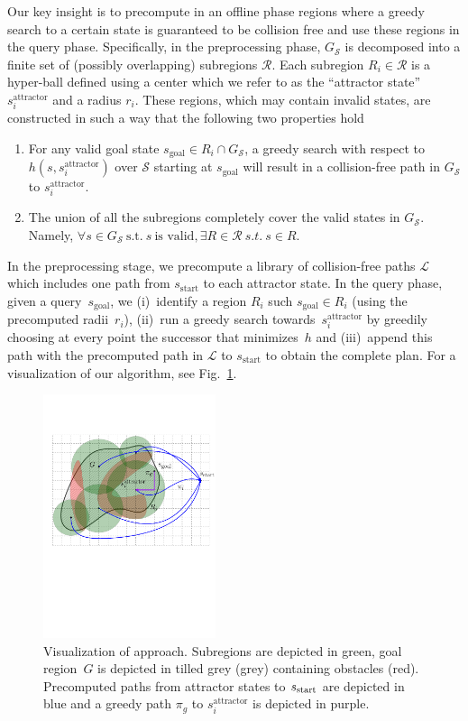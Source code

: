 \documentclass[letterpaper]{article} %
\newcommand{\calL}{\ensuremath{\mathcal{L}}\xspace}
\newcommand{\calS}{\ensuremath{\mathcal{S}}\xspace}
\newcommand{\calR}{\ensuremath{\mathcal{R}}\xspace}
\newcommand{\sAttract}{\ensuremath{s^{\text{attractor}}_i}\xspace}
\newcommand{\sStart}{\ensuremath{s_{\text{start}}\xspace}}
\newcommand{\sGoal}{\ensuremath{s_{\text{goal}}\xspace}}
\begin{document}
Our key insight is to precompute in an offline phase regions where a greedy search to a certain state is guaranteed to be collision free and use these regions in the query phase.
Specifically, in the preprocessing phase, $G_\calS$ is decomposed into a finite  set of (possibly overlapping) subregions $\calR$.
Each subregion $R_i \in \calR$ is a hyper-ball defined using a center which we refer to as the ``attractor state''~
\sAttract and a radius $r_i$.
These regions, which may contain invalid states, are constructed in such a way that the following two properties hold
\begin{enumerate}[label={\textbf{P\arabic*}}]
  \item \label{property:1} For any valid goal state $s_{\text{goal}} \in R_i \cap G_\calS$, a greedy search with respect to $h(s, \sAttract)$ over $\calS$ starting at $\sGoal$ will result in a collision-free path in $G_\calS$ to \sAttract.
  \item \label{property:2} The union of all the subregions completely cover the valid states in $G_\calS$. 
		  Namely, $\forall s \in G_\calS~\text{s.t.}~s~\text{is valid}, \exists R \in \calR \ s.t. \ s \in R$.
\end{enumerate}

In the preprocessing stage, we precompute a library of collision-free paths $\calL$ which includes one path from $\sStart$ to each attractor state. 
In the query phase, given a query~\sGoal, we 
(i)~identify a region $R_i$ such $\sGoal \in R_i$ (using the precomputed radii~$r_i$),
(ii)~run a greedy search towards~\sAttract by greedily choosing at every point the successor that minimizes~$h$ and
(iii)~append this path with the precomputed path in $\calL$ to $\sStart$ to obtain the complete plan.
For a visualization of our algorithm, see Fig.~\ref{fig:approach}.

\begin{figure}
\centering
\includegraphics[width=0.45\textwidth]{Approach.pdf}
  \caption{
  Visualization of approach. Subregions are depicted in green, 
  goal region~$G$ is depicted in tilled grey (grey) containing obstacles (red).
  Precomputed paths from attractor states to $s_{\rm{start}}$ are depicted in blue and a greedy path $\pi_g$ to \sAttract is depicted in purple. 
}
   	\label{fig:approach}
\end{figure}
\end{document}
